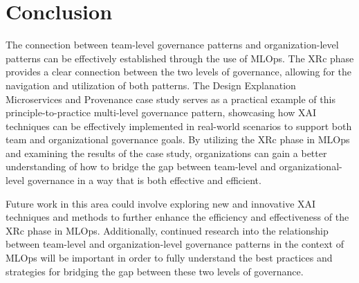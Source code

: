 \documentclass[conference]{IEEEtran}
\begin{document}
\section{Conclusion}
The connection between team-level governance patterns and organization-level patterns can be effectively established through the use of MLOps. The XRc phase provides a clear connection between the two levels of governance, allowing for the navigation and utilization of both patterns. The Design Explanation Microservices and Provenance case study serves as a practical example of this principle-to-practice multi-level governance pattern, showcasing how XAI techniques can be effectively implemented in real-world scenarios to support both team and organizational governance goals. By utilizing the XRc phase in MLOps and examining the results of the case study, organizations can gain a better understanding of how to bridge the gap between team-level and organizational-level governance in a way that is both effective and efficient.

Future work in this area could involve exploring new and innovative XAI techniques and methods to further enhance the efficiency and effectiveness of the XRc phase in MLOps. Additionally, continued research into the relationship between team-level and organization-level governance patterns in the context of MLOps will be important in order to fully understand the best practices and strategies for bridging the gap between these two levels of governance.



\end{document}

